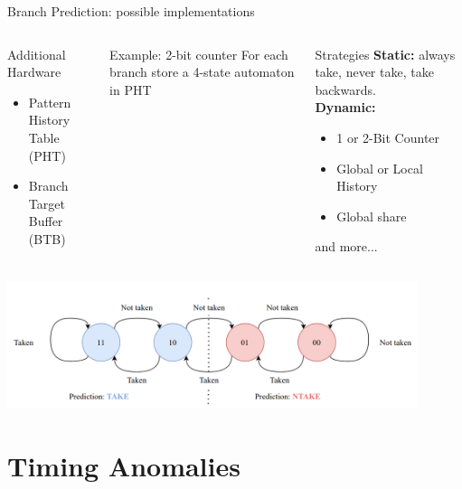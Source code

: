 \documentclass{beamer}
\begin{document}
\begin{frame}{Branch Prediction: possible implementations}
    \begin{columns}

    \begin{block}{Additional Hardware}
        \begin{itemize}
            \item Pattern History Table (PHT)
            \item Branch Target Buffer (BTB)
        \end{itemize}
    \end{block}

    \begin{exampleblock}{Example: 2-bit counter}
        For each branch store a 4-state automaton in PHT
    \end{exampleblock}


    \begin{block}{Strategies}
        \textbf{Static:} always take, never take, take backwards. \\        
        \textbf{Dynamic:} 
        \begin{itemize}
            \item 1 or 2-Bit Counter
            \item Global or Local History
            \item Global share
        \end{itemize}
        and more...
    \end{block}

    \end{columns}

    \includegraphics[width=0.9\textwidth]{pic/two-bit-counter.png}

\end{frame}

\section{Timing Anomalies}
\end{document}
